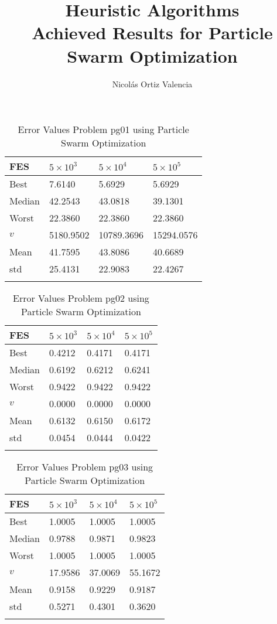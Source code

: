 \documentclass[10pt, a4paper]{book}
\title{
    Heuristic Algorithms \\
    \large Achieved Results for Particle Swarm Optimization\\
}
\author{Nicolás Ortiz Valencia}
\begin{document}
\maketitle


\begin{center}
\begin{longtable}{l l l l}
FES & $5 \times 10^{3}$ & $5 \times 10^{4}$ & $5 \times 10^{5}$ \\
\hline
Best & 7.6140 & 5.6929 & 5.6929 \\
Median & 42.2543 & 43.0818 & 39.1301 \\
Worst & 22.3860 & 22.3860 & 22.3860 \\
$v$ & 5180.9502 & 10789.3696 & 15294.0576 \\
Mean & 41.7595 & 43.8086 & 40.6689 \\
std & 25.4131 & 22.9083 & 22.4267 \\
\caption{ Error Values Problem pg01 using Particle Swarm Optimization }
\end{longtable}
\end{center}

\begin{center}
\begin{longtable}{l l l l}
FES & $5 \times 10^{3}$ & $5 \times 10^{4}$ & $5 \times 10^{5}$ \\
\hline
Best & 0.4212 & 0.4171 & 0.4171 \\
Median & 0.6192 & 0.6212 & 0.6241 \\
Worst & 0.9422 & 0.9422 & 0.9422 \\
$v$ & 0.0000 & 0.0000 & 0.0000 \\
Mean & 0.6132 & 0.6150 & 0.6172 \\
std & 0.0454 & 0.0444 & 0.0422 \\
\caption{ Error Values Problem pg02 using Particle Swarm Optimization }
\end{longtable}
\end{center}

\begin{center}
\begin{longtable}{l l l l}
FES & $5 \times 10^{3}$ & $5 \times 10^{4}$ & $5 \times 10^{5}$ \\
\hline
Best & 1.0005 & 1.0005 & 1.0005 \\
Median & 0.9788 & 0.9871 & 0.9823 \\
Worst & 1.0005 & 1.0005 & 1.0005 \\
$v$ & 17.9586 & 37.0069 & 55.1672 \\
Mean & 0.9158 & 0.9229 & 0.9187 \\
std & 0.5271 & 0.4301 & 0.3620 \\
\caption{ Error Values Problem pg03 using Particle Swarm Optimization }
\end{longtable}
\end{center}
\end{document}
